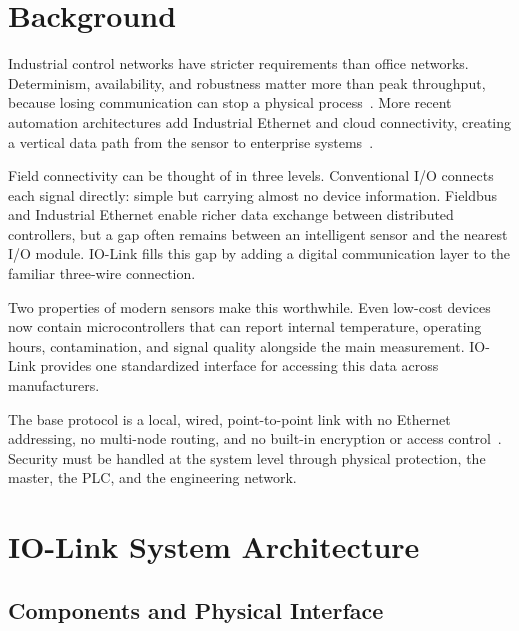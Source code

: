 \documentclass[conference]{IEEEtran}
\begin{document}
\section{Background}
\label{sec:background}

Industrial control networks have stricter requirements than office
networks. Determinism, availability, and robustness matter more than
peak throughput, because losing communication can stop a physical
process~\cite{galloway2013,moyne2007}. More recent automation
architectures add Industrial Ethernet and cloud connectivity, creating
a vertical data path from the sensor to enterprise
systems~\cite{wollschlaeger2017}.

Field connectivity can be thought of in three levels. Conventional I/O
connects each signal directly: simple but carrying almost no device
information. Fieldbus and Industrial Ethernet enable richer data
exchange between distributed controllers, but a gap often remains
between an intelligent sensor and the nearest I/O module. IO-Link fills
this gap by adding a digital communication layer to the familiar
three-wire connection.

Two properties of modern sensors make this worthwhile. Even low-cost
devices now contain microcontrollers that can report internal
temperature, operating hours, contamination, and signal quality
alongside the main measurement. IO-Link provides one standardized
interface for accessing this data across manufacturers.

The base protocol is a local, wired, point-to-point link with no
Ethernet addressing, no multi-node routing, and no built-in encryption
or access control~\cite{iol_security}. Security must be handled at the
system level through physical protection, the master, the PLC, and the
engineering network.

\section{IO-Link System Architecture}
\label{sec:sysarch}

\subsection{Components and Physical Interface}
\end{document}
